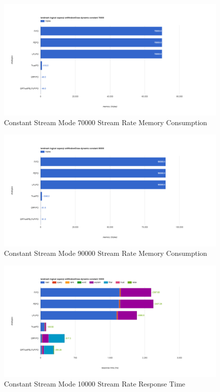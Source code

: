 \begin{figure}[!htbp]
    \centering
    \includegraphics[width=\textwidth]{img/app3-c-70000-m.png}
    \caption{Constant Stream Mode 70000 Stream Rate Memory Consumption}
\end{figure}
\begin{figure}[!htbp]
    \centering
    \includegraphics[width=\textwidth]{img/app3-c-90000-m.png}
    \caption{Constant Stream Mode 90000 Stream Rate Memory Consumption}
\end{figure}
\begin{figure}[!htbp]
    \centering
    \includegraphics[width=\textwidth]{img/app3-c-10000-r.png}
    \caption{Constant Stream Mode 10000 Stream Rate Response Time}
\end{figure}
